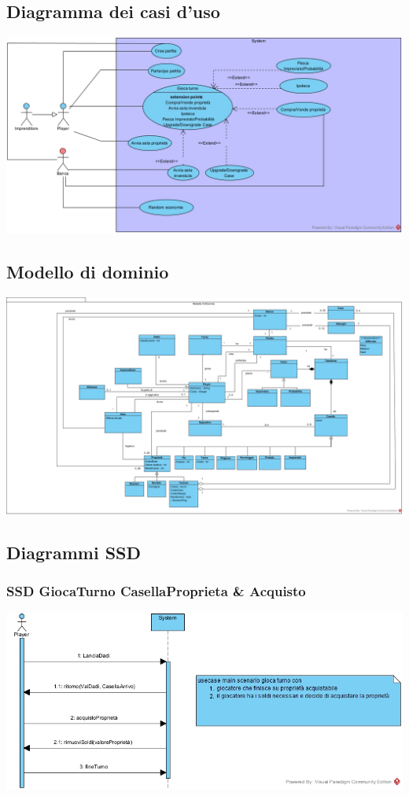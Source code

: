 \documentclass{article}
\begin{document}
\subsection{Diagramma dei casi d'uso}
\href{https://github.com/UnimibSoftEngCourse2022/progetto-monopoly-1-gangoffour2/blob/feat/doc/doc/img/ModelloCasiDUso.jpg?raw=true}
	{\includegraphics[width=\textwidth]{ModelloCasiDUso}}

\subsection{Modello di dominio}
\href{https://github.com/UnimibSoftEngCourse2022/progetto-monopoly-1-gangoffour2/blob/feat/doc/doc/img/ModelloDiDominio.jpg?raw=true}
	{\includegraphics[width=\textwidth]{ModelloDiDominio}}

\subsection{Diagrammi SSD}
\subsubsection{SSD GiocaTurno CasellaProprieta \& Acquisto}
\includegraphics[width=\textwidth]{SSD_GiocaTurno_CasellaProprieta+Acquisto}
\end{document}
